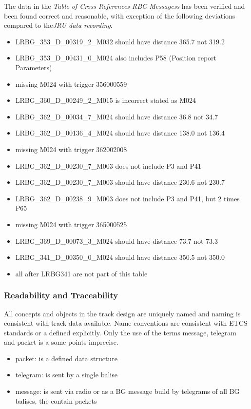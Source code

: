 \documentclass{article}
\begin{document}
The data in the \textit{Table of Cross References RBC Messagess} has been verified and been found correct and reasonable, with exception of the following deviations compared to the\textit{JRU data recording}.
\begin{itemize}
\item LRBG\_353\_D\_00319\_2\_M032 should have distance 365.7 not 319.2
\item LRBG\_353\_D\_00431\_0\_M024 also includes P58 (Position report Parameters)
\item missing M024 with trigger 356000559
\item LRBG\_360\_D\_00249\_2\_M015 is incorrect stated as M024
\item LRBG\_362\_D\_00034\_7\_M024 should have distance 36.8 not 34.7
\item LRBG\_362\_D\_00136\_4\_M024 should have distance 138.0 not 136.4
\item missing M024 with trigger 362002008
\item LRBG\_362\_D\_00230\_7\_M003 does not include P3 and P41
\item LRBG\_362\_D\_00230\_7\_M003 should have distance 230.6 not 230.7
\item LRBG\_362\_D\_00238\_9\_M003 does not include P3 and P41, but 2 times P65
\item missing M024 with trigger 365000525
\item LRBG\_369\_D\_00073\_3\_M024 should have distance 73.7 not 73.3
\item LRBG\_341\_D\_00350\_0\_M024 should have distance 350.5 not 350.0
\item all after LRBG341 are not part of this table
\end{itemize}

\subsubsection{Readability and Traceability}

All concepts and objects in the track design are uniquely named and naming is consistent with track data available. Name conventions are consistent with ETCS standards or a defined explicitly. Only the use of the terms message, telegram and packet is a some points imprecise. 
\begin{itemize}
\item packet: is a defined data structure
\item telegram: is sent by a single balise
\item message: is sent via radio or as a BG message build by telegrams of all BG balises, the contain packets
\end{itemize}
\end{document}
